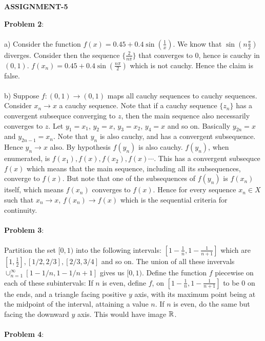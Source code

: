 \documentclass[../Main.tex]{subfiles}
\begin{document}
\begin{center}
    \textbf{ASSIGNMENT-5}
\end{center}

\textbf{Problem 2}:
\\\\ a) Consider the function $f(x)=0.45+0.4\sin(\frac{1}{x})$. We know that $\sin(n\frac{\pi}{2})$ diverges. Consider then the sequence $\{\frac{2}{n\pi}\}$ that converges to $0$, hence is cauchy in $(0,1)$. $f(x_n)=0.45+0.4\sin(\frac{n\pi}{2})$ which is not cauchy. Hence the claim is false.
\\\\ b) Suppose $f:(0,1) \to (0,1)$ maps all cauchy sequences to cauchy sequences. Consider $x_n \to x $ a cauchy sequence. Note that if a cauchy sequence $\{z_n\}$ has a convergent subsequce converging to $z$, then the main sequence also necessarily converges to $z$. Let $y_1=x_1$, $y_2=x$, $y_3=x_2$, $y_4=x$ and so on. Basically $y_{2n}=x$ and $y_{2n-1}=x_n$. Note that $y_n$ is also cauchy, and has a convergent subsequence. Hence $y_n \to x$ also. By hypothesis $f(y_n)$ is also cauchy. $f(y_n)$, when enumerated, is $f(x_1), f(x), f(x_2), f(x) \cdots$. This has a convergent subsequce $f(x)$ which means that the main sequence, including all its subsequences, converge to $f(x)$. But note that one of the subsequences of $f(y_n)$ is $f(x_n)$ itself, which means $f(x_n)$ converges to $f(x)$. Hence for every sequence $x_n \in X$ such that $x_n \to x$, $f(x_n) \to f(x)$ which is the sequential criteria for continuity.
\\\\ \textbf{Problem 3}:
\\\\ Partition the set $[0,1)$ into the following intervals: $[1-{\frac{1}{n}},1-\frac{1}{n+1}]$ which are $[1,\frac{1}{2}], [1/2,2/3],[2/3,3/4]$ and so on. The union of all these invervals $\cup_{n=1}^{\infty} [1-1/n,1-1/n+1]$ gives us $[0,1)$. Define the function $f$ piecewise on each of these subintervals: If $n$ is even, define $f$, on $[1-\frac{1}{n},1-\frac{1}{n+1}]$ to be 0 on the ends, and a triangle facing positive $y$ axis, with its maximum point being at the midpoint of the interval, attaining a value $n$. If $n$ is even, do the same but facing the downward $y$ axis. This would have image $\mathbb R$.
\\\\ \textbf{Problem 4}:
\end{document}
